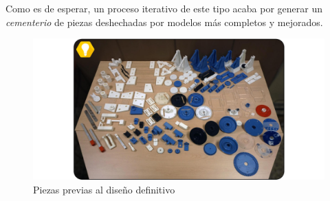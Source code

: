 Como es de esperar, un proceso iterativo de este tipo acaba por generar un \textit{cementerio} de piezas deshechadas por modelos más completos y mejorados.


\begin{figure}
   	\centering
   	\includegraphics[width=1.1\textwidth]{figuras/Imagenes_PuntoPartida/cementerio.jpg}
   	\caption{Piezas previas al diseño definitivo}
   	\label{fig:PuntoPartida:cementerio}
\end{figure}
%
